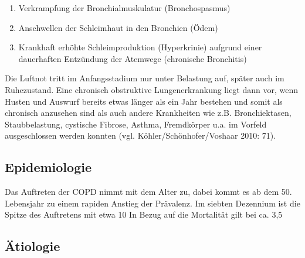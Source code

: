 \begin{enumerate}
\item Verkrampfung der Bronchialmuskulatur (Bronchospasmus)
\item Anschwellen der Schleimhaut in den Bronchien (Ödem)
\item Krankhaft erhöhte Schleimproduktion (Hyperkrinie) aufgrund einer dauerhaften Entzündung der Atemwege (chronische Bronchitis)
\end{enumerate}

Die Luftnot tritt im Anfangsstadium nur unter Belastung auf, später auch im Ruhezustand.
Eine chronisch obstruktive Lungenerkrankung liegt dann vor, wenn Husten und Auswurf bereits etwas länger als ein Jahr bestehen und somit als chronisch anzusehen sind als auch andere Krankheiten wie z.B. Bronchiektasen, Staubbelastung, cystische Fibrose, Asthma, Fremdkörper u.a. im Vorfeld ausgeschlossen werden konnten (vgl. Köhler/Schönhofer/Voshaar 2010: 71).

\subsection{Epidemiologie}
\label{epidemiologie}
Das Auftreten der COPD nimmt mit dem Alter zu, dabei kommt es ab dem 50. Lebensjahr zu einem rapiden Anstieg der Prävalenz. Im siebten Dezennium ist die Spitze des Auftretens mit etwa 10 %
In Bezug auf die Mortalität gilt bei ca. 3,5 %

\subsection{Ätiologie}
\label{ätiologie}

